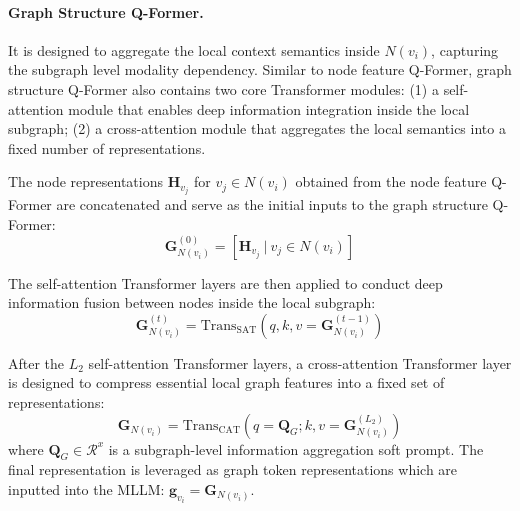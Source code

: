 \paragraph{Graph Structure Q-Former.}
It is designed to aggregate the local context semantics inside $N(v_i)$, capturing the subgraph level modality dependency.
Similar to node feature Q-Former, graph structure Q-Former also contains two core Transformer modules:
(1) a self-attention module that enables deep information integration inside the local subgraph;
(2) a cross-attention module that aggregates the local semantics into a fixed number of representations.


The node representations $\mathbf{H}_{v_j}$ for $v_j\in N(v_i)$ obtained from the node feature Q-Former are concatenated and serve as the initial inputs to the graph structure Q-Former:
\begin{equation} 
\mathbf{G}^{(0)}_{N(v_i)} = \left[{\mathbf{H}_{v_j} \ | \ v_j \in N(v_i)} \right] 
\end{equation} 

The self-attention Transformer layers are then applied to conduct deep information fusion between nodes inside the local subgraph:
\begin{equation}
\mathbf{G}^{(t)}_{N(v_i)} = \text{Trans}_{\text{SAT}} \left( q, k, v=\mathbf{G}^{(t-1)}_{N(v_i)} \right)
\end{equation}

After the $L_2$ self-attention Transformer layers, a cross-attention Transformer layer is designed to compress essential local graph features into a fixed set of representations:
\begin{equation}
\mathbf{G}_{N(v_i)} = \text{Trans}_{\text{CAT}} \left(q=\bm{Q}_G; k, v=\mathbf{G}^{(L_2)}_{N(v_i)} \right)
\end{equation}
where $\bm{Q}_G\in \mathcal{R}^x$ is a subgraph-level information aggregation soft prompt. 
The final representation is leveraged as graph token representations which are inputted into the MLLM: $\bm{g}_{v_i}=\mathbf{G}_{N(v_i)}$.



